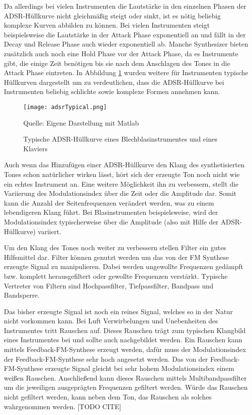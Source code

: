 Da allerdings bei vielen Instrumenten die Lautstärke in den einzelnen Phasen der ADSR-Hüllkurve nicht gleichmäßig steigt oder sinkt, ist es nötig beliebig komplexe Kurven abbilden zu können. Bei vielen Instrumenten steigt beispielsweise die Lautstärke in der Attack Phase exponentiell an und fällt in der Decay und Release Phase auch wieder exponentiell ab. Manche Synthesizer bieten zusätzlich auch noch eine Hold Phase vor der Attack Phase, da es Instrumente gibt, die einige Zeit benötigen bis sie nach dem Anschlagen des Tones in die Attack Phase eintreten. In Abbildung \ref{fig:adsrTypical} wurden weitere für Instrumenten typische Hüllkurven dargestellt um zu verdeutlichen, dass die ADSR-Hüllkurve bei Instrumenten beliebig schlichte sowie komplexe Formen annehmen kann.

\begin{figure} [ht]
\centering
  \texttt{[image: adsrTypical.png]}
\caption{Typische ADSR-Hüllkurve eines Blechblasinstrumentes und eines Klaviers}
\label{fig:adsrTypical}
Quelle: Eigene Darstellung mit Matlab
\end{figure}

Auch wenn das Hinzufügen einer ADSR-Hüllkurve den Klang des synthetisierten Tones schon natürlicher wirken lässt, hört sich der erzeugte Ton noch nicht wie ein echtes Instrument an. Eine weitere Möglichkeit ihn zu verbessern, stellt die Variierung des Modulationsindex über die Zeit oder die Amplitude dar. Somit kann die Anzahl der Seitenfrequenzen verändert werden, was zu einem lebendigeren Klang führt. Bei Blasinstrumenten beispielsweise, wird der Modulationsindex typischerweise über die Amplitude (also mit Hilfe der ADSR-Hüllkurve) variiert. \cite[S. 532]{chowningPaper}

Um den Klang des Tones noch weiter zu verbessern stellen Filter ein gutes Hilfsmittel dar. Filter können genutzt werden um das von der FM Synthese erzeugte Signal zu manipulieren. Dabei werden ungewollte Frequenzen gedämpft bzw. komplett herausgefiltert oder gewollte Frequenzen verstärkt. Typische Vertreter von Filtern sind Hochpassfilter, Tiefpassfilter, Bandpass und Bandsperre. \cite[S. 100-104]{stotz}

Das bisher erzeugte Signal ist noch ein reines Signal, welches so in der Natur nicht vorkommen kann. Bei Luft Verwirbelungen und Unebenheiten des Instrumentes tritt Rauschen auf. Dieses Rauschen trägt zum typischen Klangbild eines Instrumentes bei und sollte auch nachgebildet werden. Ein Rauschen kann mittels Feedback-FM-Synthese erzeugt werden, dafür muss der Modulationsindex der Feedback-FM-Synthese sehr hoch angesetzt werden. Das von der Feedback-FM-Synthese erzeugte Signal gleicht bei sehr hohem Modulationsindex einem weißen Rauschen. Anschließend kann dieses Rauschen mittels Multibandpassfilter um die jeweiligen ausgeprägten Frequenzen gefiltert werden. Würde das Rauschen nicht gefiltert werden, kann neben dem Ton, das Rauschen als solches wahrgenommen werden. [TODO CITE]

